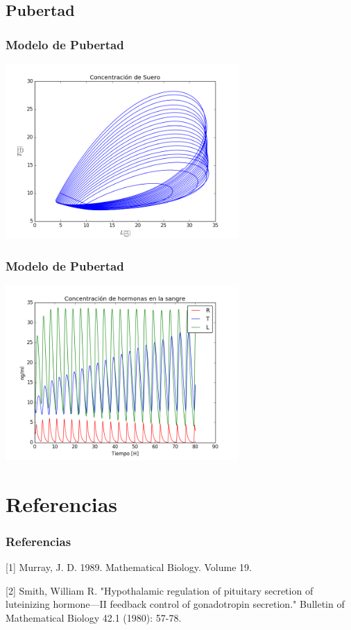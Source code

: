 \documentclass[10pt]{beamer}
\begin{document}
\subsection{Pubertad}
\begin{frame}
\frametitle{Modelo de Pubertad}
\begin{center}
 \includegraphics[width=3.5in]{imagenes/Graficas/Pubertad/pubertad_concentracion_de_suero.png}
\end{center}
\end{frame}

\begin{frame}
\frametitle{Modelo de Pubertad}
\begin{center}
 \includegraphics[width=3.5in]{imagenes/Graficas/Pubertad/pubertad.png}
\end{center}
\end{frame}

\section{Referencias}
\begin{frame}
\frametitle{Referencias}
[1] Murray, J. D. 1989. Mathematical Biology. Volume 19. 

[2] Smith, William R. "Hypothalamic regulation of pituitary secretion of luteinizing hormone—II feedback control of gonadotropin secretion." Bulletin of Mathematical Biology 42.1 (1980): 57-78.
\end{frame}
\end{document}
